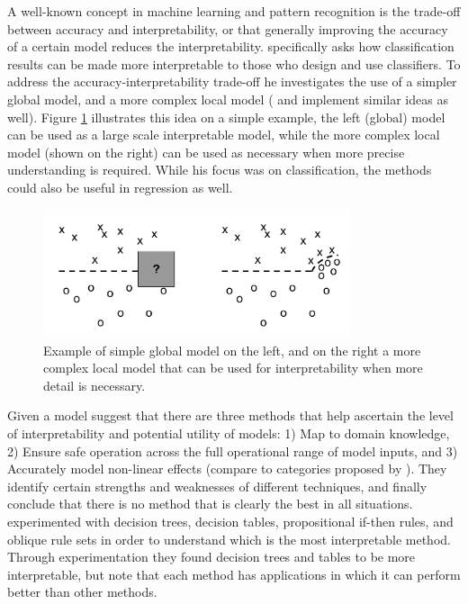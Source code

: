     A well-known concept in machine learning and pattern recognition is the trade-off between accuracy and interpretability, or that generally improving the accuracy of a certain model reduces the interpretability. \citet{Ruping2006-xj} specifically asks how classification results can be made more interpretable to those who design and use classifiers. To address the accuracy-interpretability trade-off he investigates the use of a simpler global model, and a more complex local model (\citet{Otte2013-oo} and \citet{Ribeiro2016-uc} implement similar ideas as well). Figure \ref{fig:ruping} illustrates this idea on a simple example, the left (global) model can be used as a large scale interpretable model, while the more complex local model (shown on the right) can be used as necessary when more precise understanding is required. While his focus was on classification, the methods could also be useful in regression as well.

    \begin{figure}[htbp]
    \centering
    \includegraphics[width=0.8\textwidth]{Figures/global_local}
    \caption{Example of simple global model on the left, and on the right a more complex local model that can be used for interpretability when more detail is necessary.}
    \label{fig:ruping}
    \end{figure}

    Given a model \citet{Van_Belle2013-ph} suggest that there are three methods that help ascertain the level of interpretability and potential utility of models: 1) Map to domain knowledge, 2) Ensure safe operation across the full operational range of model inputs, and 3) Accurately model non-linear effects (compare to categories proposed by \citet{Lipton2016-ug}). They identify certain strengths and weaknesses of different techniques, and finally conclude that there is no method that is clearly the best in all situations. \citet{Huysmans2011-th} experimented with decision trees, decision tables, propositional if-then rules, and oblique rule sets in order to understand which is the most interpretable method. Through experimentation they found decision trees and tables to be more interpretable, but note that each method has applications in which it can perform better than other methods.
    
